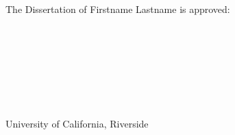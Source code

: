 

\vspace{1.0in}

The Dissertation of {Firstname Lastname} is approved: \\

\begin{center}
\vspace{0.5in}

\hspace{1.5in} \hrulefill \\
\vspace{1.0in}

\hspace{1.5in} \hrulefill \\
\vspace{1.0in}

\hspace{1.5in} \hrulefill \\

\end{center}

\\
\vfill
\begin{center}
    University of California, Riverside
\end{center}
